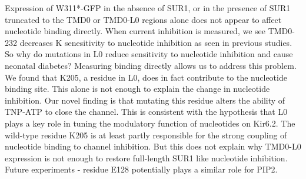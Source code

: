Expression of W311*-GFP in the absence of SUR1, or in the presence of SUR1 truncated to the TMD0 or TMD0-L0 regions alone does not appear to affect nucleotide binding directly.
When current inhibition is measured, we see TMD0-232 decreases K\ATP{} senesitivity to nucleotide inhibition as seen in previous studies.
So why do mutations in L0 reduce sensitivity to nucleotide inhibition and cause neonatal diabetes?
Measuring binding directly allows us to address this problem.
We found that K205, a residue in L0, does in fact contribute to the nucleotide binding site.
This alone is not enough to explain the change in nucleotide inhibition.
Our novel finding is that mutating this residue alters the ability of TNP-ATP to close the channel.
This is consistent with the hypothesis that L0 plays a key role in tuning the modulatory function of nucleotides on Kir6.2.
The wild-type residue K205 is at least partly responsible for the strong coupling of nucleotide binding to channel inhibition.
But this does not explain why TMD0-L0 expression is not enough to restore full-length SUR1 like nucleotide inhibition.
Future experiments - residue E128 potentially plays a similar role for PIP2.

